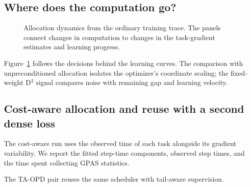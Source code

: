 \subsection{Where does the computation go?}

\begin{figure}[t]
    \centering
    \caption{Allocation dynamics from the ordinary training trace.
    The panels connect changes in computation to changes in the
    task-gradient estimates and learning progress.}
    \label{fig:allocation_dynamics}
\end{figure}

Figure~\ref{fig:allocation_dynamics} follows the decisions behind the
learning curves. The comparison with unpreconditioned allocation
isolates the optimizer's coordinate scaling; the fixed-weight
D$^3$ signal compares noise with remaining gap and learning velocity.

\subsection{Cost-aware allocation and reuse with a second dense loss}

The cost-aware run uses the observed time of each task alongside its
gradient variability. We report the fitted step-time components,
observed step times, and the time spent collecting GPAS statistics.

The TA-OPD pair reuses the same scheduler with tail-aware supervision.
